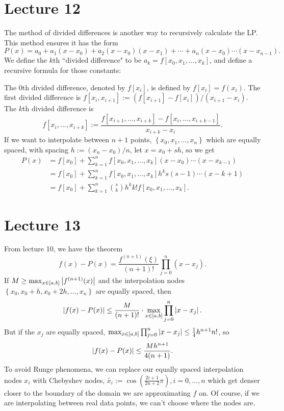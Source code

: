 \documentclass{article}
\begin{document}
\section{Lecture 12}
The method of divided differences is another way to recursively calculate the LP. This method ensures it has the form
\[ P(x) = a_0 + a_1 (x-x_0) + a_2(x-x_0)(x-x_1)+ \cdots + a_n(x-x_0)\cdots (x-x_{n-1}). \]
We define the $k$th ``divided difference" to be $a_k=f[x_0,x_1,\dots,x_k]$, and define a recursive formula for those constants:
\par
The 0th divided difference, denoted by $f[x_i]$, is defined by $f[x_i]=f(x_i)$. The first divided difference is $f[x_i,x_{i+1}] := (f[x_{i+1}]-f[x_i])/(x_{i+1}-x_i)$. The $k$th divided difference is
\[ f[x_i,\dots,x_{i+k}] := \frac{f[x_{i+1},\dots,x_{i+k}] - f[x_i,\dots,x_{i+k-1}]}{x_{i+k}-x_i}. \]
If we want to interpolate between $n+1$ points, $ \left\{ x_0, x_1, \dots,x_n \right\}$ which are equally spaced, with spacing $h := (x_n-x_0)/n$, let $x=x_0+sh$, so we get
\begin{align*}
    P(x) &= f[x_0] + \sum_{k=1}^n f[x_0, x_1, \dots, x_k] (x-x_0) \cdots (x-x_{k-1}) \\
         &= f[x_0] + \sum_{k=1}^n f[x_0, x_1, \dots, x_k]h^k s (s-1) \cdots (x-k+1) \\
         &= f[x_0] + \sum_{k=1}^n \binom{s}{k} h^k k! f[x_0, x_1, \dots, x_k].
\end{align*}

\section{Lecture 13}
From lecture 10, we have the theorem
\[ f(x)-P(x) = \frac{f^{(n+1)}(\xi)}{(n+1)!} \prod_{j=0}^n (x-x_j). \]
If $M \geq \max_{x \in [a,b]} \left\lvert f^{(n+1)}(x) \right\rvert$ and the interpolation nodes $ \left\{ x_0, x_0+h, x_0 + 2h, \dots, x_n \right\}$ are equally spaced, then
\[ \left\lvert f(x)-P(x) \right\rvert \leq \frac{M}{(n+1)!} \cdot \max_{x \in [a,b]} \prod_{j=0}^n \left\lvert x-x_j \right\rvert. \]
But if the $x_j$ are equally spaced, $\max_{x \in [a,b]} \prod_{j=0}^n \left\lvert x-x_j \right\rvert \leq \frac{1}{4} h^{n+1}n!$, so
\[ \left\lvert f(x)-P(x) \right\rvert \leq \frac{Mh^{n+1}}{4(n+1)}. \]
To avoid Runge phenomena, we can replace our equally spaced interpolation nodes $x_i$ with Chebyshev nodes, $\widetilde{x_i} := \cos \left( \frac{2i+1}{2n+2} \pi \right), i = 0, \dots, n$ which get denser closer to the boundary of the domain we are approximating $f$ on.
Of course, if we are interpolating between real data points, we can't choose where the nodes are.
\end{document}
